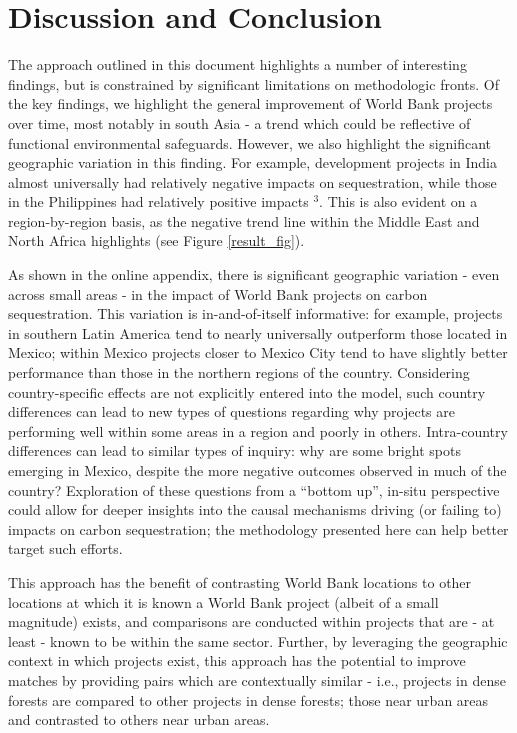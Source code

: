 \documentclass{article}\usepackage[]{graphicx}\usepackage[]{color}
\newenvironment{knitrout}{}{}  %
\begin{document}
\begin{knitrout}
\section{Discussion and Conclusion}
The approach outlined in this document highlights a number of interesting findings, but is constrained by significant limitations on methodologic fronts.
Of the key findings, we highlight the general improvement of World Bank projects over time, most notably in south Asia - a trend which could be reflective of functional environmental safeguards.  
However, we also highlight the significant geographic variation in this finding.  For example, development projects in India almost universally had relatively negative impacts on sequestration, while those in the Philippines had relatively positive impacts \begin{math}^{3}\end{math}.  
This is also evident on a region-by-region basis, as the negative trend line within the Middle East and North Africa highlights (see Figure \ref{result_fig}).  
\par
As shown in the online appendix, there is significant geographic variation - even across small areas - in the impact of World Bank projects on carbon sequestration.  
This variation is in-and-of-itself informative: for example, projects in southern Latin America tend to nearly universally outperform those located in Mexico; within Mexico projects closer to Mexico City tend to have slightly better performance than those in the northern regions of the country.  
Considering country-specific effects are not explicitly entered into the model, such country differences can lead to new types of questions regarding why projects are performing well within some areas in a region and poorly in others. 
Intra-country differences can lead to similar types of inquiry: why are some bright spots emerging in Mexico, despite the more negative outcomes observed in much of the country?  
Exploration of these questions from a “bottom up”, in-situ perspective could allow for deeper insights into the causal mechanisms driving (or failing to) impacts on carbon sequestration; the methodology presented here can help better target such efforts.
\par
This approach has the benefit of contrasting World Bank locations to other locations at which it is known a World Bank project (albeit of a small magnitude) exists, and comparisons are conducted within projects that are - at least - known to be within the same sector. 
Further, by leveraging the geographic context in which projects exist, this approach has the potential to improve matches by providing pairs which are contextually similar - i.e., projects in dense forests are compared to other projects in dense forests; those near urban areas and contrasted to others near urban areas.

\end{knitrout}
\end{document}
